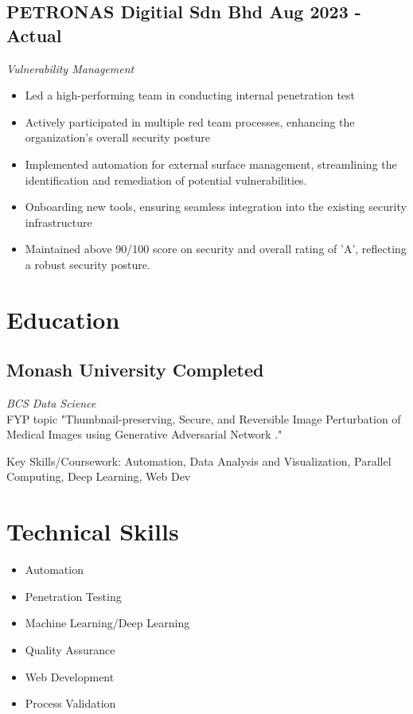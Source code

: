 \documentclass[a4paper,10pt]{article}
\begin{document}
	\subsection*{PETRONAS Digitial Sdn Bhd \hfill Aug 2023 - Actual}
	\textit{Vulnerability Management}
	\begin{itemize}
		\item Led a high-performing team in conducting internal penetration test
		\item Actively participated in multiple red team processes, enhancing the organization's overall security posture
		\item Implemented automation for external surface management, streamlining the identification and remediation of potential vulnerabilities.
		\item Onboarding new tools, ensuring seamless integration into the existing security infrastructure
		\item Maintained above 90/100 score on security and overall rating of 'A', reflecting a robust security posture.
	\end{itemize}
	
	\section*{ Education}
	
	\subsection*{Monash University \hfill Completed}
	\textit{BCS Data Science}\\
	FYP topic "Thumbnail-preserving, Secure, and Reversible Image Perturbation of Medical Images using Generative Adversarial Network ."
	
	Key Skills/Coursework: Automation, Data Analysis and Visualization, Parallel Computing, Deep Learning, Web Dev
	
	\section*{ Technical Skills}
	\begin{center}
		\begin{itemize}[label=, itemsep=-3pt]
			\item Automation
			\item Penetration Testing
			\item Machine Learning/Deep Learning
			\item Quality Assurance
			\item Web Development
			\item Process Validation
		\end{itemize}
	\end{center}
	
\end{document}
